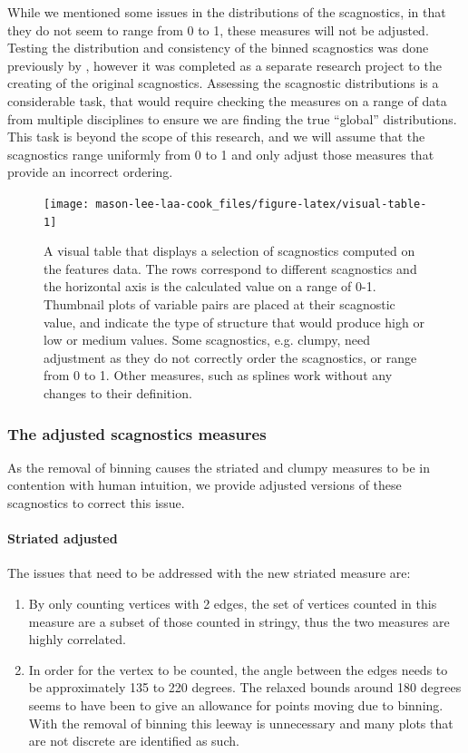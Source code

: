 While we mentioned some issues in the distributions of the scagnostics, in that they do not seem to range from 0 to 1, these measures will not be adjusted. Testing the distribution and consistency of the binned scagnostics was done previously by \citet{scagdist}, however it was completed as a separate research project to the creating of the original scagnostics. Assessing the scagnostic distributions is a considerable task, that would require checking the measures on a range of data from multiple disciplines to ensure we are finding the true ``global'' distributions. This task is beyond the scope of this research, and we will assume that the scagnostics range uniformly from 0 to 1 and only adjust those measures that provide an incorrect ordering.

\begin{figure}
\texttt{[image: mason-lee-laa-cook\_files/figure-latex/visual-table-1]} \caption{A visual table that displays a selection of scagnostics computed on the features data. The rows correspond to different scagnostics and the horizontal axis is the calculated value on a range of 0-1. Thumbnail plots of variable pairs are placed at their scagnostic value, and indicate the type of structure that would produce high or low or medium values. Some scagnostics, e.g. clumpy, need adjustment as they do not correctly order the scagnostics, or range from 0 to 1. Other measures, such as splines work without any changes to their definition.}\label{fig:visual-table}
\end{figure}

\subsubsection{The adjusted scagnostics measures}\label{the-adjusted-scagnostics-measures}

As the removal of binning causes the striated and clumpy measures to be in contention with human intuition, we provide adjusted versions of these scagnostics to correct this issue.

\paragraph{Striated adjusted}\label{striated-adjusted}

The issues that need to be addressed with the new striated measure are:

\begin{enumerate}
\def\labelenumi{\arabic{enumi}.}
\tightlist
\item
  By only counting vertices with 2 edges, the set of vertices counted in this measure are a subset of those counted in stringy, thus the two measures are highly correlated.
\item
  In order for the vertex to be counted, the angle between the edges needs to be approximately 135 to 220 degrees. The relaxed bounds around 180 degrees seems to have been to give an allowance for points moving due to binning. With the removal of binning this leeway is unnecessary and many plots that are not discrete are identified as such.
\end{enumerate}

